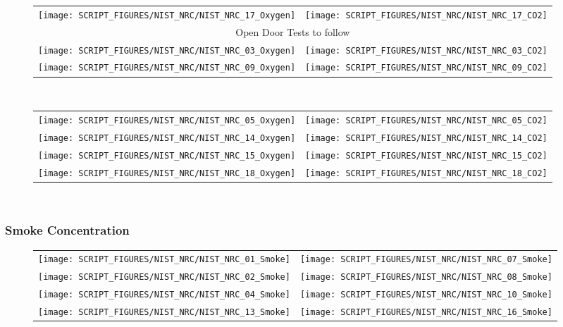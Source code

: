 \clearpage

\begin{figure}[!ht]
\begin{tabular*}{\textwidth}{l@{\extracolsep{\fill}}r}
\texttt{[image: SCRIPT\_FIGURES/NIST\_NRC/NIST\_NRC\_17\_Oxygen]} &
\texttt{[image: SCRIPT\_FIGURES/NIST\_NRC/NIST\_NRC\_17\_CO2]} \\
\multicolumn{2}{c}{Open Door Tests to follow} \\
\texttt{[image: SCRIPT\_FIGURES/NIST\_NRC/NIST\_NRC\_03\_Oxygen]} &
\texttt{[image: SCRIPT\_FIGURES/NIST\_NRC/NIST\_NRC\_03\_CO2]} \\
\texttt{[image: SCRIPT\_FIGURES/NIST\_NRC/NIST\_NRC\_09\_Oxygen]} &
\texttt{[image: SCRIPT\_FIGURES/NIST\_NRC/NIST\_NRC\_09\_CO2]}
\end{tabular*}\
\end{figure}

\begin{figure}[!ht]
\begin{tabular*}{\textwidth}{l@{\extracolsep{\fill}}r}
\texttt{[image: SCRIPT\_FIGURES/NIST\_NRC/NIST\_NRC\_05\_Oxygen]} &
\texttt{[image: SCRIPT\_FIGURES/NIST\_NRC/NIST\_NRC\_05\_CO2]} \\
\texttt{[image: SCRIPT\_FIGURES/NIST\_NRC/NIST\_NRC\_14\_Oxygen]} &
\texttt{[image: SCRIPT\_FIGURES/NIST\_NRC/NIST\_NRC\_14\_CO2]} \\
\texttt{[image: SCRIPT\_FIGURES/NIST\_NRC/NIST\_NRC\_15\_Oxygen]} &
\texttt{[image: SCRIPT\_FIGURES/NIST\_NRC/NIST\_NRC\_15\_CO2]} \\
\texttt{[image: SCRIPT\_FIGURES/NIST\_NRC/NIST\_NRC\_18\_Oxygen]} &
\texttt{[image: SCRIPT\_FIGURES/NIST\_NRC/NIST\_NRC\_18\_CO2]}
\end{tabular*}\
\end{figure}

\clearpage

\subsubsection{Smoke Concentration}

\begin{figure}[!ht]
\begin{tabular*}{\textwidth}{l@{\extracolsep{\fill}}r}
\texttt{[image: SCRIPT\_FIGURES/NIST\_NRC/NIST\_NRC\_01\_Smoke]} &
\texttt{[image: SCRIPT\_FIGURES/NIST\_NRC/NIST\_NRC\_07\_Smoke]} \\
\texttt{[image: SCRIPT\_FIGURES/NIST\_NRC/NIST\_NRC\_02\_Smoke]} &
\texttt{[image: SCRIPT\_FIGURES/NIST\_NRC/NIST\_NRC\_08\_Smoke]} \\
\texttt{[image: SCRIPT\_FIGURES/NIST\_NRC/NIST\_NRC\_04\_Smoke]} &
\texttt{[image: SCRIPT\_FIGURES/NIST\_NRC/NIST\_NRC\_10\_Smoke]} \\
\texttt{[image: SCRIPT\_FIGURES/NIST\_NRC/NIST\_NRC\_13\_Smoke]} &
\texttt{[image: SCRIPT\_FIGURES/NIST\_NRC/NIST\_NRC\_16\_Smoke]}
\end{tabular*}\
\label{NIST_NRC_Smoke_Closed}
\end{figure}

